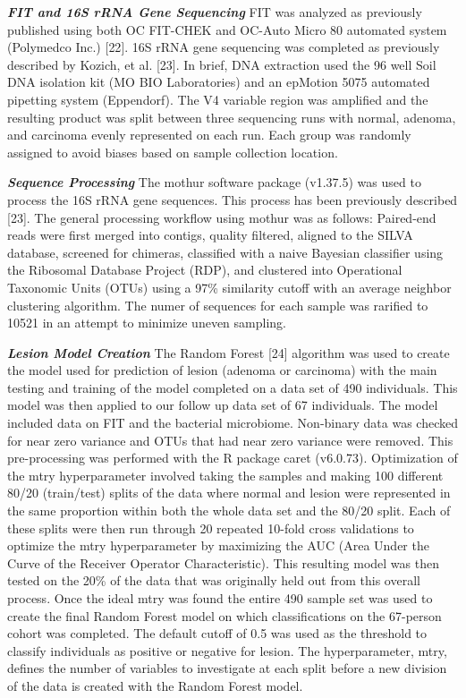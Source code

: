 \documentclass[12pt,]{article}
\begin{document}
\textbf{\emph{FIT and 16S rRNA Gene Sequencing}} FIT was analyzed as
previously published using both OC FIT-CHEK and OC-Auto Micro 80
automated system (Polymedco Inc.) {[}22{]}. 16S rRNA gene sequencing was
completed as previously described by Kozich, et al. {[}23{]}. In brief,
DNA extraction used the 96 well Soil DNA isolation kit (MO BIO
Laboratories) and an epMotion 5075 automated pipetting system
(Eppendorf). The V4 variable region was amplified and the resulting
product was split between three sequencing runs with normal, adenoma,
and carcinoma evenly represented on each run. Each group was randomly
assigned to avoid biases based on sample collection location.

\textbf{\emph{Sequence Processing}} The mothur software package
(v1.37.5) was used to process the 16S rRNA gene sequences. This process
has been previously described {[}23{]}. The general processing workflow
using mothur was as follows: Paired-end reads were first merged into
contigs, quality filtered, aligned to the SILVA database, screened for
chimeras, classified with a naive Bayesian classifier using the
Ribosomal Database Project (RDP), and clustered into Operational
Taxonomic Units (OTUs) using a 97\% similarity cutoff with an average
neighbor clustering algorithm. The numer of sequences for each sample
was rarified to 10521 in an attempt to minimize uneven sampling.

\textbf{\emph{Lesion Model Creation}} The Random Forest {[}24{]}
algorithm was used to create the model used for prediction of lesion
(adenoma or carcinoma) with the main testing and training of the model
completed on a data set of 490 individuals. This model was then applied
to our follow up data set of 67 individuals. The model included data on
FIT and the bacterial microbiome. Non-binary data was checked for near
zero variance and OTUs that had near zero variance were removed. This
pre-processing was performed with the R package caret (v6.0.73).
Optimization of the mtry hyperparameter involved taking the samples and
making 100 different 80/20 (train/test) splits of the data where normal
and lesion were represented in the same proportion within both the whole
data set and the 80/20 split. Each of these splits were then run through
20 repeated 10-fold cross validations to optimize the mtry
hyperparameter by maximizing the AUC (Area Under the Curve of the
Receiver Operator Characteristic). This resulting model was then tested
on the 20\% of the data that was originally held out from this overall
process. Once the ideal mtry was found the entire 490 sample set was
used to create the final Random Forest model on which classifications on
the 67-person cohort was completed. The default cutoff of 0.5 was used
as the threshold to classify individuals as positive or negative for
lesion. The hyperparameter, mtry, defines the number of variables to
investigate at each split before a new division of the data is created
with the Random Forest model.
\end{document}
